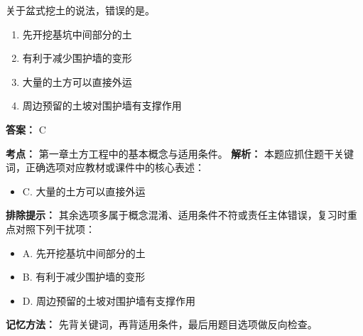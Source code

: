 \documentclass[UTF8,fontset=fandol,11pt]{ctexart}
\begin{document}
\begin{quizbox}[title={第 13 题}]
关于盆式挖土的说法，错误的是。\\
\begin{enumerate}[label=\Alph*.]
\item 先开挖基坑中间部分的土
\item 有利于减少围护墙的变形
\item 大量的土方可以直接外运
\item 周边预留的土坡对围护墙有支撑作用
\end{enumerate}
\textbf{答案：} C
\vspace{0.25em}
\begin{answerbox}[title={考点解析}]
\textbf{考点：} 第一章土方工程中的基本概念与适用条件。
\textbf{解析：} 本题应抓住题干关键词，正确选项对应教材或课件中的核心表述：
\begin{itemize}
\item C. 大量的土方可以直接外运
\end{itemize}
\textbf{排除提示：} 其余选项多属于概念混淆、适用条件不符或责任主体错误，复习时重点对照下列干扰项：
\begin{itemize}
\item A. 先开挖基坑中间部分的土
\item B. 有利于减少围护墙的变形
\item D. 周边预留的土坡对围护墙有支撑作用
\end{itemize}
\textbf{记忆方法：} 先背关键词，再背适用条件，最后用题目选项做反向检查。
\end{answerbox}
\end{quizbox}

\vspace{0.2em}
\end{document}
